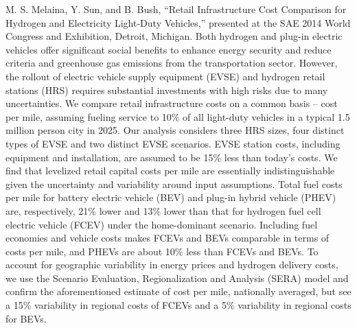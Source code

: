 \documentclass[]{article}
\begin{document}
M. S. Melaina, Y. Sun, and B. Bush, ``Retail Infrastructure Cost
Comparison for Hydrogen and Electricity Light-Duty Vehicles,'' presented
at the SAE 2014 World Congress and Exhibition, Detroit, Michigan. Both
hydrogen and plug-in electric vehicles offer significant social benefits
to enhance energy security and reduce criteria and greenhouse gas
emissions from the transportation sector. However, the rollout of
electric vehicle supply equipment (EVSE) and hydrogen retail stations
(HRS) requires substantial investments with high risks due to many
uncertainties. We compare retail infrastructure costs on a common basis
-- cost per mile, assuming fueling service to 10\% of all light-duty
vehicles in a typical 1.5 million person city in 2025. Our analysis
considers three HRS sizes, four distinct types of EVSE and two distinct
EVSE scenarios. EVSE station costs, including equipment and
installation, are assumed to be 15\% less than today's costs. We find
that levelized retail capital costs per mile are essentially
indistinguishable given the uncertainty and variability around input
assumptions. Total fuel costs per mile for battery electric vehicle
(BEV) and plug-in hybrid vehicle (PHEV) are, respectively, 21\% lower
and 13\% lower than that for hydrogen fuel cell electric vehicle (FCEV)
under the home-dominant scenario. Including fuel economies and vehicle
costs makes FCEVs and BEVs comparable in terms of costs per mile, and
PHEVs are about 10\% less than FCEVs and BEVs. To account for geographic
variability in energy prices and hydrogen delivery costs, we use the
Scenario Evaluation, Regionalization and Analysis (SERA) model and
confirm the aforementioned estimate of cost per mile, nationally
averaged, but see a 15\% variability in regional costs of FCEVs and a
5\% variability in regional costs for BEVs.
\end{document}
